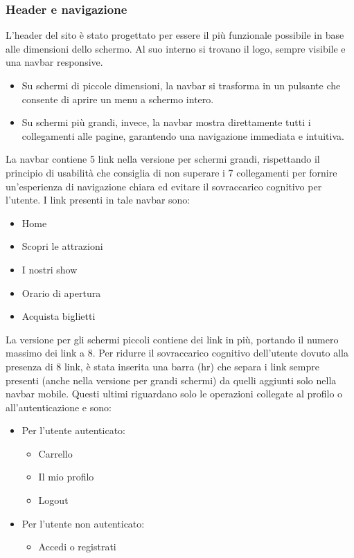 \subsubsection{Header e navigazione}
L’header del sito è stato progettato per essere il più funzionale possibile in base alle dimensioni dello schermo. Al suo interno si trovano il logo, sempre visibile e una navbar responsive.
\begin{itemize}
    \item Su schermi di piccole dimensioni, la navbar si trasforma in un pulsante che consente di aprire un menu a schermo intero.
    \item Su schermi più grandi, invece, la navbar mostra direttamente tutti i collegamenti alle pagine, garantendo una navigazione immediata e intuitiva.
\end{itemize}
La navbar contiene 5 link nella versione per schermi grandi, rispettando il principio di usabilità che consiglia di non superare i 7 collegamenti per fornire un'esperienza di navigazione chiara ed evitare il sovraccarico cognitivo per l'utente. I link presenti in tale navbar sono:
\begin{itemize}
    \item Home
    \item Scopri le attrazioni
    \item I nostri show
    \item Orario di apertura
    \item Acquista biglietti
\end{itemize}
La versione per gli schermi piccoli contiene dei link in più, portando il numero massimo dei link a 8. Per ridurre il sovraccarico cognitivo dell'utente dovuto alla presenza di 8 link, è stata inserita una barra (hr) che separa i link sempre presenti (anche nella versione per grandi schermi) da quelli aggiunti solo nella navbar mobile. Questi ultimi riguardano solo le operazioni collegate al profilo o all'autenticazione e sono:
\begin{itemize}
    \item Per l'utente autenticato:
    \begin{itemize}
        \item Carrello
        \item Il mio profilo
        \item Logout
    \end{itemize}
    \item Per l'utente non autenticato:
    \begin{itemize}
        \item Accedi o registrati
    \end{itemize}
\end{itemize}
